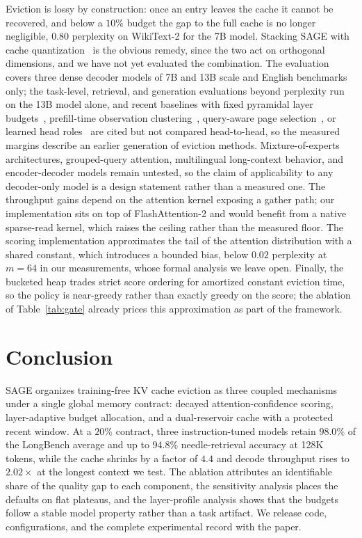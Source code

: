 Eviction is lossy by construction: once an entry leaves the cache it
cannot be recovered, and below a $10\%$ budget the gap to the full
cache is no longer negligible, $0.80$ perplexity on WikiText-2 for the
7B model. Stacking SAGE with cache
quantization~\cite{liu2024kivi} is
the obvious remedy, since the two act on orthogonal dimensions, and we
have not yet evaluated the combination. The evaluation covers three
dense decoder models of 7B and 13B scale and English benchmarks only;
the task-level, retrieval, and generation evaluations beyond perplexity
run on the 13B model alone, and recent baselines with fixed pyramidal
layer budgets~\cite{zhang2024pyramidkv}, prefill-time observation
clustering~\cite{li2024snapkv}, query-aware page
selection~\cite{tang2024quest}, or learned head
roles~\cite{xiao2024duoattention} are cited but not compared
head-to-head, so the measured margins describe an earlier generation
of eviction methods. Mixture-of-experts
architectures, grouped-query attention, multilingual long-context
behavior, and encoder-decoder models remain untested, so the claim of
applicability to any decoder-only model is a design statement rather
than a measured one. The throughput
gains depend on the attention kernel exposing a gather path; our
implementation sits on top of FlashAttention-2 and would benefit from
a native sparse-read kernel, which raises the ceiling rather than the
measured floor. The scoring implementation approximates the tail of
the attention distribution with a shared constant, which introduces a
bounded bias, below $0.02$ perplexity at $m = 64$ in our measurements,
whose formal analysis we leave open. Finally, the bucketed heap trades
strict score ordering for amortized constant eviction time, so the
policy is near-greedy rather than exactly greedy on the score; the
ablation of Table~\ref{tab:gate} already prices this approximation as
part of the framework.

\section{Conclusion}\label{sec:conclusion}

SAGE organizes training-free KV cache eviction as three coupled
mechanisms under a single global memory contract: decayed
attention-confidence scoring, layer-adaptive budget allocation, and a
dual-reservoir cache with a protected recent window. At a $20\%$
contract, three instruction-tuned models retain $98.0\%$ of the
LongBench average and up to $94.8\%$ needle-retrieval accuracy at 128K
tokens, while the cache shrinks by a factor of $4.4$ and decode
throughput rises to $2.02\times$ at the longest context we test. The
ablation attributes an identifiable share of the quality gap to each
component, the sensitivity analysis places the defaults on flat
plateaus, and the layer-profile analysis shows that the budgets follow
a stable model property rather than a task artifact. We release code,
configurations, and the complete experimental record with the paper.

